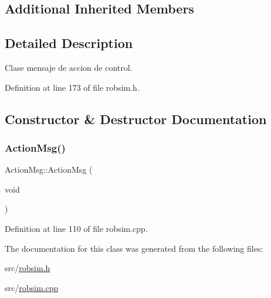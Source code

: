 \subsection*{Additional Inherited Members}


\subsection{Detailed Description}
Clase mensaje de accion de control. 

Definition at line 173 of file robsim.\+h.



\subsection{Constructor \& Destructor Documentation}
\mbox{\label{classActionMsg_ab22c6cee704bd1ee2dbcbf54dd16cc4c}} 
\subsubsection{\texorpdfstring{Action\+Msg()}{ActionMsg()}}
{\footnotesize\ttfamily Action\+Msg\+::\+Action\+Msg (\begin{DoxyParamCaption}\item[{void}]{ }\end{DoxyParamCaption})}



Definition at line 110 of file robsim.\+cpp.



The documentation for this class was generated from the following files\+:\begin{DoxyCompactItemize}
\item 
src/\hyperlink{robsim_8h}{robsim.\+h}\item 
src/\hyperlink{robsim_8cpp}{robsim.\+cpp}\end{DoxyCompactItemize}
